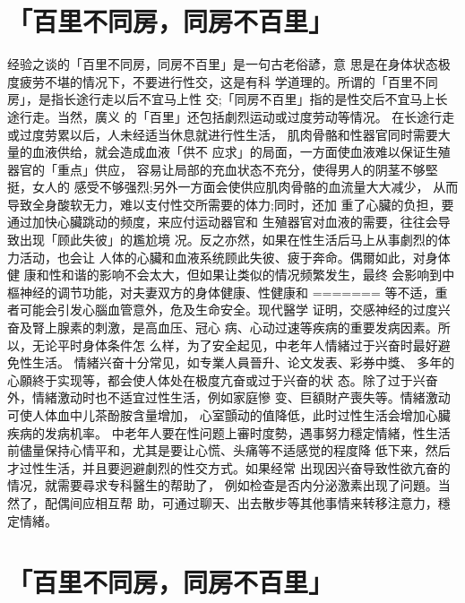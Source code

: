 \documentclass[12pt,UTF8]{ctexbook}
\begin{document}
\section{「百里不同房，同房不百里」}

经验之谈的「百里不同房，同房不百里」是一句古老俗諺，意
思是在身体状态极度疲劳不堪的情况下，不要进行性交，这是有科
学道理的。所谓的「百里不同房」，是指长途行走以后不宜马上性
交;「同房不百里」指的是性交后不宜马上长途行走。当然，廣义
的「百里」还包括劇烈运动或过度劳动等情况。
在长途行走或过度劳累以后，人未经适当休息就进行性生活，
肌肉骨骼和性器官同时需要大量的血液供给，就会造成血液「供不
应求」的局面，一方面使血液难以保证生殖器官的「重点」供应，
容易让局部的充血状态不充分，使得男人的阴茎不够堅挺，女人的
感受不够强烈;另外一方面会使供应肌肉骨骼的血流量大大减少，
从而导致全身酸软无力，难以支付性交所需要的体力;同时，还加
重了心臟的负担，要通过加快心臟跳动的频度，来应付运动器官和
生殖器官对血液的需要，往往会导致出现「顾此失彼」的尷尬境
况。反之亦然，如果在性生活后马上从事劇烈的体力活动，也会让
人体的心臟和血液系统顾此失彼、疲于奔命。偶爾如此，对身体健
康和性和谐的影响不会太大，但如果让类似的情况频繁发生，最终
会影响到中樞神经的调节功能，对夫妻双方的身体健康、性健康和
=======
等不适，重者可能会引发心腦血管意外，危及生命安全。现代醫学
证明，交感神经的过度兴奋及腎上腺素的刺激，是高血压、冠心
病、心动过速等疾病的重要发病因素。所以，无论平时身体条件怎
么样，为了安全起见，中老年人情緒过于兴奋时最好避免性生活。
情緒兴奋十分常见，如专業人員晉升、论文发表、彩券中獎、
多年的心願終于实现等，都会使人体处在极度亢奋或过于兴奋的状
态。除了过于兴奋外，情緒激动时也不适宜过性生活，例如家庭慘
变、巨額財产喪失等。情緒激动可使人体血中儿茶酚胺含量增加，
心室顫动的值降低，此时过性生活会增加心臟疾病的发病机率。
中老年人要在性问题上審时度勢，遇事努力穩定情緒，性生活
前儘量保持心情平和，尤其是要让心慌、头痛等不适感觉的程度降
低下来，然后才过性生活，并且要迥避劇烈的性交方式。如果经常
出现因兴奋导致性欲亢奋的情况，就需要尋求专科醫生的帮助了，
例如检查是否内分泌激素出现了问題。当然了，配偶间应相互帮
助，可通过聊天、出去散步等其他事情来转移注意力，穩定情緒。

\section{「百里不同房，同房不百里」}
\end{document}
